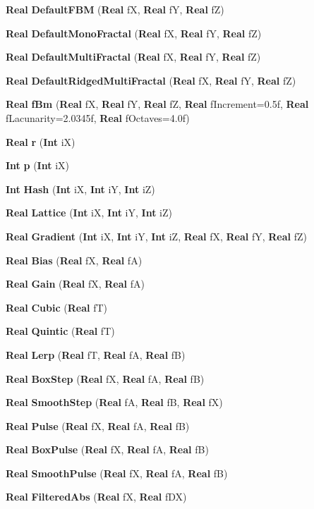 \begin{CompactItemize}
{\bf Real} {\bf Default\-FBM} ({\bf Real} f\-X, {\bf Real} f\-Y, {\bf Real} f\-Z)
\item 
{\bf Real} {\bf Default\-Mono\-Fractal} ({\bf Real} f\-X, {\bf Real} f\-Y, {\bf Real} f\-Z)
\item 
{\bf Real} {\bf Default\-Multi\-Fractal} ({\bf Real} f\-X, {\bf Real} f\-Y, {\bf Real} f\-Z)
\item 
{\bf Real} {\bf Default\-Ridged\-Multi\-Fractal} ({\bf Real} f\-X, {\bf Real} f\-Y, {\bf Real} f\-Z)
\item 
{\bf Real} {\bf f\-Bm} ({\bf Real} f\-X, {\bf Real} f\-Y, {\bf Real} f\-Z, {\bf Real} f\-Increment=0.5f, {\bf Real} f\-Lacunarity=2.0345f, {\bf Real} f\-Octaves=4.0f)
\item 
{\bf Real} {\bf r} ({\bf Int} i\-X)
\item 
{\bf Int} {\bf p} ({\bf Int} i\-X)
\item 
{\bf Int} {\bf Hash} ({\bf Int} i\-X, {\bf Int} i\-Y, {\bf Int} i\-Z)
\item 
{\bf Real} {\bf Lattice} ({\bf Int} i\-X, {\bf Int} i\-Y, {\bf Int} i\-Z)
\item 
{\bf Real} {\bf Gradient} ({\bf Int} i\-X, {\bf Int} i\-Y, {\bf Int} i\-Z, {\bf Real} f\-X, {\bf Real} f\-Y, {\bf Real} f\-Z)
\item 
{\bf Real} {\bf Bias} ({\bf Real} f\-X, {\bf Real} f\-A)
\item 
{\bf Real} {\bf Gain} ({\bf Real} f\-X, {\bf Real} f\-A)
\item 
{\bf Real} {\bf Cubic} ({\bf Real} f\-T)
\item 
{\bf Real} {\bf Quintic} ({\bf Real} f\-T)
\item 
{\bf Real} {\bf Lerp} ({\bf Real} f\-T, {\bf Real} f\-A, {\bf Real} f\-B)
\item 
{\bf Real} {\bf Box\-Step} ({\bf Real} f\-X, {\bf Real} f\-A, {\bf Real} f\-B)
\item 
{\bf Real} {\bf Smooth\-Step} ({\bf Real} f\-A, {\bf Real} f\-B, {\bf Real} f\-X)
\item 
{\bf Real} {\bf Pulse} ({\bf Real} f\-X, {\bf Real} f\-A, {\bf Real} f\-B)
\item 
{\bf Real} {\bf Box\-Pulse} ({\bf Real} f\-X, {\bf Real} f\-A, {\bf Real} f\-B)
\item 
{\bf Real} {\bf Smooth\-Pulse} ({\bf Real} f\-X, {\bf Real} f\-A, {\bf Real} f\-B)
\item 
{\bf Real} {\bf Filtered\-Abs} ({\bf Real} f\-X, {\bf Real} f\-DX)
\item 

\end{CompactItemize}
